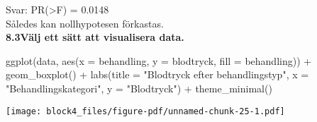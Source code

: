 \documentclass[
  letterpaper,
  DIV=11,
  numbers=noendperiod]{scrartcl}
\newenvironment{Shaded}{\begin{snugshade}}{\end{snugshade}}
\newcommand{\AttributeTok}[1]{\textcolor[rgb]{0.40,0.45,0.13}{#1}}
\newcommand{\FunctionTok}[1]{\textcolor[rgb]{0.28,0.35,0.67}{#1}}
\newcommand{\NormalTok}[1]{\textcolor[rgb]{0.00,0.23,0.31}{#1}}
\newcommand{\SpecialCharTok}[1]{\textcolor[rgb]{0.37,0.37,0.37}{#1}}
\newcommand{\StringTok}[1]{\textcolor[rgb]{0.13,0.47,0.30}{#1}}
\begin{document}
\hfill\break
Svar: PR(\textgreater F) = 0.0148\\
Således kan nollhypotesen förkastas.\\

\textbf{8.3Välj ett sätt att visualisera data.}

\begin{Shaded}
\begin{Highlighting}[]
\FunctionTok{ggplot}\NormalTok{(data, }\FunctionTok{aes}\NormalTok{(}\AttributeTok{x =}\NormalTok{ behandling, }\AttributeTok{y =}\NormalTok{ blodtryck, }\AttributeTok{fill =}\NormalTok{ behandling)) }\SpecialCharTok{+}
  \FunctionTok{geom\_boxplot}\NormalTok{() }\SpecialCharTok{+}
  \FunctionTok{labs}\NormalTok{(}\AttributeTok{title =} \StringTok{"Blodtryck efter behandlingstyp"}\NormalTok{,}
       \AttributeTok{x =} \StringTok{"Behandlingskategori"}\NormalTok{,}
       \AttributeTok{y =} \StringTok{"Blodtryck"}\NormalTok{) }\SpecialCharTok{+}
  \FunctionTok{theme\_minimal}\NormalTok{()}
\end{Highlighting}
\end{Shaded}

\texttt{[image: block4\_files/figure-pdf/unnamed-chunk-25-1.pdf]}
\end{document}
